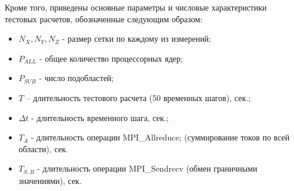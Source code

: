 Кроме того, приведены основные параметры и числовые характеристики тестовых расчетов, обозначенные следующим образом:
\begin{itemize}
	\item $N_X, N_Y, N_Z$  - размер сетки по каждому из измерений;
	\item $P_{ALL}$  - общее количество процессорных ядер;
	\item $P_{SUB}$  - число подобластей;
	\item $T$ – длительность тестового расчета (50 временных шагов), сек.;
	\item $\Delta t$  - длительность временного шага, сек.;
	\item $T_{A}$ - длительность операции MPI\_Allreduce; (суммирование токов по всей области), сек.
	\item $T_{S,B}$ - длительность операции MPI\_Sendrecv (обмен граничными значениями), сек.
\end{itemize}


